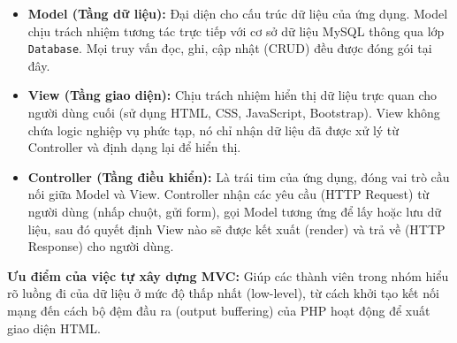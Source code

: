 \begin{itemize}
    \item \textbf{Model (Tầng dữ liệu):} Đại diện cho cấu trúc dữ liệu của ứng dụng. Model chịu trách nhiệm tương tác trực tiếp với cơ sở dữ liệu MySQL thông qua lớp \texttt{Database}. Mọi truy vấn đọc, ghi, cập nhật (CRUD) đều được đóng gói tại đây.
    \item \textbf{View (Tầng giao diện):} Chịu trách nhiệm hiển thị dữ liệu trực quan cho người dùng cuối (sử dụng HTML, CSS, JavaScript, Bootstrap). View không chứa logic nghiệp vụ phức tạp, nó chỉ nhận dữ liệu đã được xử lý từ Controller và định dạng lại để hiển thị.
    \item \textbf{Controller (Tầng điều khiển):} Là trái tim của ứng dụng, đóng vai trò cầu nối giữa Model và View. Controller nhận các yêu cầu (HTTP Request) từ người dùng (nhấp chuột, gửi form), gọi Model tương ứng để lấy hoặc lưu dữ liệu, sau đó quyết định View nào sẽ được kết xuất (render) và trả về (HTTP Response) cho người dùng.
\end{itemize}
\textbf{Ưu điểm của việc tự xây dựng MVC:} Giúp các thành viên trong nhóm hiểu rõ luồng đi của dữ liệu ở mức độ thấp nhất (low-level), từ cách khởi tạo kết nối mạng đến cách bộ đệm đầu ra (output buffering) của PHP hoạt động để xuất giao diện HTML.